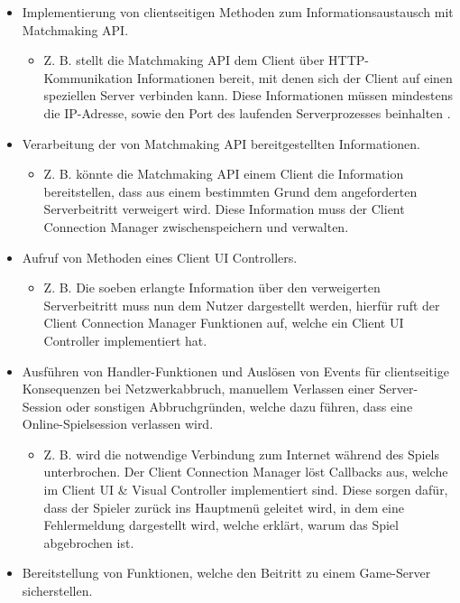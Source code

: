  \begin{itemize}
	\item Implementierung von clientseitigen Methoden zum Informationsaustausch mit Matchmaking API.
	\begin{itemize}
		\item Z. B. stellt die Matchmaking API dem Client über HTTP-Kommunikation Informationen bereit, mit denen sich der Client auf einen speziellen Server verbinden kann. Diese Informationen müssen mindestens die IP-Adresse, sowie den Port des laufenden Serverprozesses beinhalten \cite{Hauser.2015}.
	\end{itemize}
	\item Verarbeitung der von Matchmaking API bereitgestellten Informationen. 
	\begin{itemize}
		\item Z. B. könnte die Matchmaking API einem Client die Information bereitstellen, dass aus einem bestimmten Grund dem angeforderten Serverbeitritt verweigert wird. Diese Information muss der Client Connection Manager zwischenspeichern und verwalten.
	\end{itemize}
	\item Aufruf von Methoden eines Client UI Controllers.
	\begin{itemize}
		\item Z. B. Die soeben erlangte Information über den verweigerten Serverbeitritt muss nun dem Nutzer dargestellt werden, hierfür ruft der Client Connection Manager Funktionen auf, welche ein Client UI Controller implementiert hat.
	\end{itemize}
	\item Ausführen von Handler-Funktionen und Auslösen von Events für clientseitige Konsequenzen bei Netzwerkabbruch, manuellem Verlassen einer Server-Session oder sonstigen Abbruchgründen, welche dazu führen, dass eine Online-Spielsession verlassen wird.
	\begin{itemize}
		\item Z. B. wird die notwendige Verbindung zum Internet während des Spiels unterbrochen. Der Client Connection Manager löst Callbacks aus, welche im Client UI \& Visual Controller implementiert sind. Diese sorgen dafür, dass der Spieler zurück ins Hauptmenü geleitet wird, in dem eine Fehlermeldung dargestellt wird, welche erklärt, warum das Spiel abgebrochen ist.
	\end{itemize}
	\item Bereitstellung von Funktionen, welche den Beitritt zu einem Game-Server sicherstellen.
\end{itemize}


